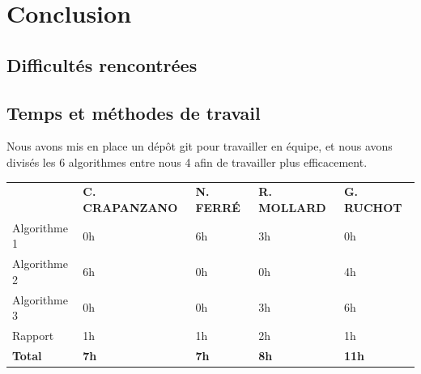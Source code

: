 \documentclass{scrreprt}
\begin{document}
\chapter{Conclusion}


\section{Difficultés rencontrées}

\section{Temps et méthodes de travail}
Nous avons mis en place un dépôt git pour travailler en équipe, et nous avons divisés les 6 algorithmes entre nous 4 afin de travailler plus efficacement.

\begin{tabular}{lllll}
                                          & \textbf{C. CRAPANZANO} & \textbf{N. FERRÉ} & \textbf{R. MOLLARD} & \textbf{G. RUCHOT} \\
Algorithme 1                              & 0h                         & 6h                     & 3h                       & 0h            \\
Algorithme 2                              & 6h                         & 0h                     & 0h                       & 4h            \\
Algorithme 3                              & 0h                         & 0h                     & 3h                       & 6h            \\
Rapport                                   & 1h                         & 1h                     & 2h                       & 1h            \\
\textbf{Total}                            & \textbf{7h}               & \textbf{7h}           & \textbf{8h}             & \textbf{11h}
\end{tabular}
\end{document}
